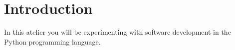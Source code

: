 \section{Introduction}
\label{sec.intro}

In this atelier you will be experimenting with software development
in the Python programming language.



